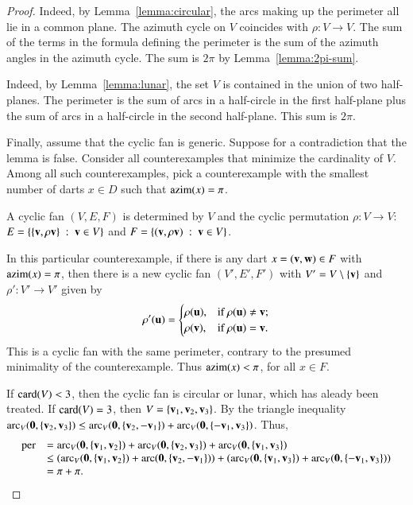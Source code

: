 \begin{proof} 
Indeed, by Lemma~\ref{lemma:circular}, 
the arcs making up the perimeter all lie in a common plane.   
The azimuth cycle on $V$ coincides with $\rho:V\to V$.
The sum of the terms in the formula defining the perimeter is the sum of the azimuth angles in the azimuth cycle.  The sum is $2\pi$ by Lemma~\ref{lemma:2pi-sum}.


Indeed, by Lemma~\ref{lemma:lunar}, the set $V$ is contained in the union of two half-planes.
The perimeter is the sum of arcs in a half-circle in the first half-plane plus
the sum of arcs in a half-circle in the second half-plane. This sum is $2\pi$.

Finally, assume that the cyclic fan is generic.
Suppose for a contradiction that the lemma is false.  Consider all counterexamples
that minimize the cardinality of $V$.  Among all such counterexamples, pick a counterexample with the smallest number of darts $x\in D$ such that ${\operatorname{azim}}(x) = \pi$.

A cyclic fan $(V,E,F)$ is determined by $V$ and the cyclic permutation $\rho:V\to V$:  $E=\{\{{\mathbf v},\rho {\mathbf v}\}\ :\  {\mathbf v}\in V\}$ and $F = \{({\mathbf v},\rho {\mathbf v})\ :\  {\mathbf v}\in V\}$.

In this particular counterexample, if there is any dart $x=({\mathbf v},{\mathbf w})\in F$ with ${\operatorname{azim}}(x)=\pi$, then there is a new cyclic fan $(V',E',F')$ with $V' = V\setminus\{{\mathbf v}\}$ and $\rho':V'\to V'$ given by 
$$
\rho'({\mathbf u}) = \begin{cases}
\rho({\mathbf u}), & \text{if } \rho({\mathbf u})\ne {\mathbf v};\\
\rho({\mathbf v}), & \text{if }\rho({\mathbf u}) = {\mathbf v}.\\
\end{cases}
$$
This is a cyclic fan with the same perimeter, contrary to the presumed minimality of the counterexample.  Thus ${\operatorname{azim}}(x) <\pi$, for all $x\in F$.

If ${\operatorname{card}}(V) <3$, then the cyclic fan is circular or lunar, which has aleady been treated.  If ${\operatorname{card}}(V)=3$, then $V=\{{\mathbf v}_1,{\mathbf v}_2,{\mathbf v}_3\}$.  By the triangle inequality $\operatorname{arc}_V({\mathbf 0},\{{\mathbf v}_2,{\mathbf v}_3\}) \le \operatorname{arc}_V({\mathbf 0},\{{\mathbf v}_2,-{\mathbf v}_1\})+\operatorname{arc}_V({\mathbf 0},\{-{\mathbf v}_1,{\mathbf v}_3\})$.  Thus,
$$
\begin{array}{rll}
{\operatorname{per}} &=\operatorname{arc}_V({\mathbf 0},\{{\mathbf v}_1,{\mathbf v}_2\}) + \operatorname{arc}_V({\mathbf 0},\{{\mathbf v}_2,{\mathbf v}_3\}) + \operatorname{arc}_V({\mathbf 0},\{{\mathbf v}_1,{\mathbf v}_3\})\\
&\le(\operatorname{arc}_V({\mathbf 0},\{{\mathbf v}_1,{\mathbf v}_2\})+\operatorname{arc}({\mathbf 0},\{{\mathbf v}_2,-{\mathbf v}_1\}))+(\operatorname{arc}_V({\mathbf 0},\{{\mathbf v}_1,{\mathbf v}_3\})+\operatorname{arc}_V({\mathbf 0},\{-{\mathbf v}_1,{\mathbf v}_3\})) \\
   &= \pi+\pi.
\end{array}
$$


\end{proof}

